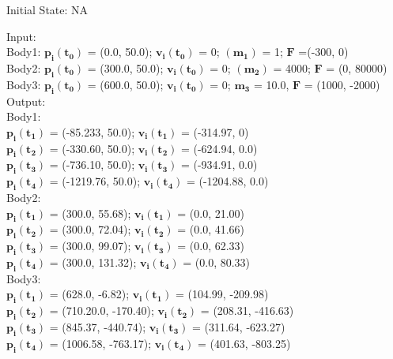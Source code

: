 \documentclass[12pt, titlepage]{article}
\begin{document}
\begin{enumerate}
Initial State: NA

Input: \\
Body1: $\mathbf{p_i}$$\mathbf{(t_0)}$ = (0.0, 50.0); $\mathbf{v_i}$$\mathbf{(t_0)}$ = 0; $\mathbf{(m_1)}$ = 1; $\mathbf{F}$ =(-300, 0) \\
Body2: $\mathbf{p_i}$$\mathbf{(t_0)}$ = (300.0, 50.0); $\mathbf{v_i}$$\mathbf{(t_0)}$ = 0; $\mathbf{(m_2)}$ = 4000; $\mathbf{F}$ = (0, 80000)\\
Body3: $\mathbf{p_i}$$\mathbf{(t_0)}$ = (600.0, 50.0); $\mathbf{v_i}$$\mathbf{(t_0)}$ = 0;
$\mathbf{m_3}$$ \mathbf{}$ = 10.0, $\mathbf{F}$ = (1000, -2000)\\


Output:\\
Body1:\\
$\mathbf{p_i}$$\mathbf{(t_1)}$ = (-85.233, 50.0);
$\mathbf{v_i}$$\mathbf{(t_1)}$ = (-314.97, 0)\\
$\mathbf{p_i}$$\mathbf{(t_2)}$ = (-330.60, 50.0);
$\mathbf{v_i}$$\mathbf{(t_2)}$ = (-624.94, 0.0)\\
$\mathbf{p_i}$$\mathbf{(t_3)}$ = (-736.10, 50.0);
$\mathbf{v_i}$$\mathbf{(t_3)}$ = (-934.91, 0.0)\\
$\mathbf{p_i}$$\mathbf{(t_4)}$ = (-1219.76, 50.0);
$\mathbf{v_i}$$\mathbf{(t_4)}$ = (-1204.88, 0.0)\\

Body2:\\
$\mathbf{p_i}$$\mathbf{(t_1)}$ = (300.0, 55.68);
$\mathbf{v_i}$$\mathbf{(t_1)}$ = (0.0, 21.00)\\
$\mathbf{p_i}$$\mathbf{(t_2)}$ = (300.0, 72.04);
$\mathbf{v_i}$$\mathbf{(t_2)}$ = (0.0, 41.66)\\
$\mathbf{p_i}$$\mathbf{(t_3)}$ = (300.0, 99.07);
$\mathbf{v_i}$$\mathbf{(t_3)}$ = (0.0, 62.33)\\
$\mathbf{p_i}$$\mathbf{(t_4)}$ = (300.0, 131.32);
$\mathbf{v_i}$$\mathbf{(t_4)}$ = (0.0, 80.33)\\

Body3:\\
$\mathbf{p_i}$$\mathbf{(t_1)}$ = (628.0, -6.82);
$\mathbf{v_i}$$\mathbf{(t_1)}$ = (104.99, -209.98)\\
$\mathbf{p_i}$$\mathbf{(t_2)}$ = (710.20.0, -170.40);
$\mathbf{v_i}$$\mathbf{(t_2)}$ = (208.31, -416.63)\\
$\mathbf{p_i}$$\mathbf{(t_3)}$ = (845.37, -440.74);
$\mathbf{v_i}$$\mathbf{(t_3)}$ = (311.64, -623.27)\\
$\mathbf{p_i}$$\mathbf{(t_4)}$ = (1006.58, -763.17);
$\mathbf{v_i}$$\mathbf{(t_4)}$ = (401.63, -803.25)\\


\end{enumerate}
\end{document}
